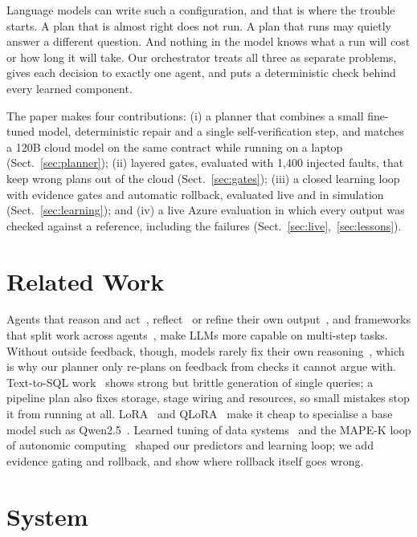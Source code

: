 \documentclass[runningheads]{llncs}
\begin{document}
Language models can write such a configuration, and that is where the trouble starts. A plan that
is almost right does not run. A plan that runs may quietly answer a different question. And
nothing in the model knows what a run will cost or how long it will take. Our orchestrator
treats all three as separate problems, gives each decision to exactly one agent, and puts a
deterministic check behind every learned component.

The paper makes four contributions: (i) a planner that combines a small fine-tuned model,
deterministic repair and a single self-verification step, and matches a 120B cloud model on the
same contract while running on a laptop (Sect.~\ref{sec:planner}); (ii) layered gates, evaluated with 1{,}400 injected
faults, that keep wrong plans out of the cloud (Sect.~\ref{sec:gates}); (iii) a closed learning
loop with evidence gates and automatic rollback, evaluated live and in simulation
(Sect.~\ref{sec:learning}); and (iv) a live Azure evaluation in which every output was checked
against a reference, including the failures (Sect.~\ref{sec:live},~\ref{sec:lessons}).

\section{Related Work}

Agents that reason and act~\cite{react}, reflect~\cite{reflexion} or refine their own
output~\cite{selfrefine}, and frameworks that split work across agents~\cite{autogen,metagpt},
make LLMs more capable on multi-step tasks. Without outside feedback, though, models rarely fix
their own reasoning~\cite{selfcorrect}, which is why our planner only re-plans on feedback from
checks it cannot argue with. Text-to-SQL work~\cite{spider,rajkumar} shows strong but brittle
generation of single queries; a pipeline plan also fixes storage, stage wiring and resources, so
small mistakes stop it from running at all. LoRA~\cite{lora} and QLoRA~\cite{qlora} make it cheap to
specialise a base model such as Qwen2.5~\cite{qwen25}. Learned tuning of data
systems~\cite{ottertune} and the MAPE-K loop of autonomic computing~\cite{autonomic} shaped our
predictors and learning loop; we add evidence gating and rollback, and show where rollback itself
goes wrong.

\section{System}
\label{sec:design}
\end{document}
